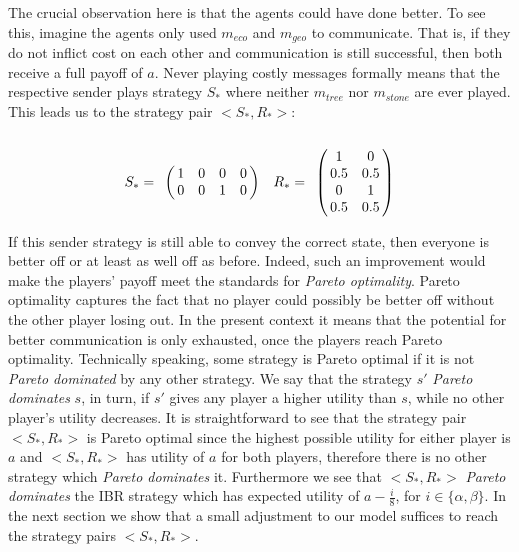 \documentclass[10pt]{article}
\begin{document}
The crucial observation here is that the agents could have done better. To see this, imagine the agents only used $m_{eco}$ and $m_{geo}$ to communicate. That is, if they do not inflict cost on each other and communication is still successful, then both receive a full payoff of $a$. Never playing costly messages formally means that the respective sender plays strategy $S_*$ where neither $m_{tree}$ nor $m_{stone}$ are ever played. This leads us to the strategy pair $<S_*,R_*>$:
\begin{equation*}
S_*=
\bordermatrix{
            & & & &    \cr
 &       1 &    0      & 0       & 0 \cr
 &       0 &         0 & 1      & 0
 }\quad
R_*= \bordermatrix{
           &  & \cr
   & 1 & 0 \cr
    & 0.5 & 0.5 \cr
    & 0 & 1 \cr
    & 0.5 & 0.5 \cr
}
\end{equation*}

If this sender strategy is still able to convey the correct state, then everyone is better off or at least as well off as before. Indeed, such an improvement would make the players' payoff meet the standards for \textit{Pareto optimality}. Pareto optimality captures the fact that no player could possibly be better off without the other player losing out. In the present context it means that the potential for better communication is only exhausted, once the players reach Pareto optimality.
Technically speaking, some strategy is Pareto optimal if it is not \textit{Pareto dominated} by any other strategy. We say that the strategy $s'$ \textit{Pareto dominates} $s$, in turn, if $s'$ gives any player a higher utility than $s$, while no other player's utility decreases.
It is straightforward to see that the strategy pair $<S_*,R_*>$ is Pareto optimal since the highest possible utility for either player is $a$ and $<S_*,R_*>$ has utility of $a$ for both players, therefore there is no other strategy which \textit{Pareto dominates} it. Furthermore we see that $<S_*,R_*>$ \textit{Pareto dominates} the IBR strategy which has expected utility of $a-\tfrac{i}{8}$, for $i\in \{\alpha,\beta \}$. In the next section we show that a small adjustment to our model suffices to reach the strategy pairs $<S_*,R_*>$.
\end{document}
